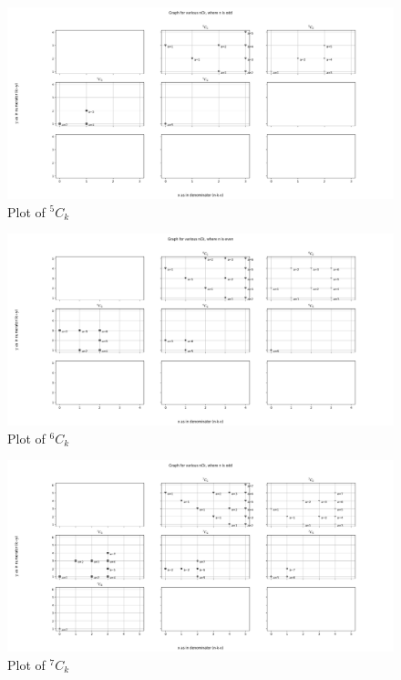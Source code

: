 \documentclass[12pt, twoside]{article}
\newcommand*{\Combination}[2]{{}^{#1}C_{#2}}%
\begin{document}
\begin{figure}[ph!]	
	\includegraphics[width=\linewidth]{5Ck.png}
	\caption{Plot of $\Combination{5}{k}$}
	\label{5Ck}
\end{figure}
\begin{figure}[ph!]	
	\includegraphics[width=\linewidth]{6Ck.png}
	\caption{Plot of $\Combination{6}{k}$}
	\label{6Ck}
\end{figure}
\begin{figure}[ph!]	
	\includegraphics[width=\linewidth]{7Ck.png}
	\caption{Plot of $\Combination{7}{k}$}
	\label{7Ck}
\end{figure}
\end{document}
